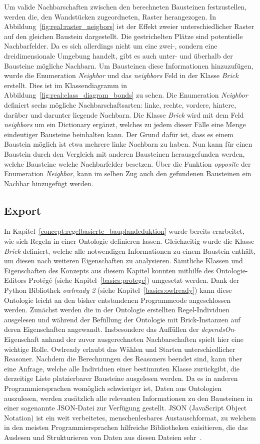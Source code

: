 Um valide Nachbarschaften zwischen den berechneten Bausteinen festzustellen, werden die, den Wandstücken zugeordneten, Raster herangezogen.
In Abbildung~\ref{fig:real:raster_neigbors} ist der Effekt zweier unterschiedlicher Raster auf den gleichen Baustein dargestellt.
Die gestrichelten Plätze sind potentielle Nachbarfelder.
Da es sich allerdings nicht um eine zwei-, sondern eine dreidimensionale Umgebung handelt, gibt es auch unter- und überhalb der Bausteine mögliche Nachbarn.
Um Bausteinen diese Informationen hinzuzufügen, wurde die Enumeration \textit{Neighbor} und das \textit{neighbors} Feld in der Klasse \textit{Brick} erstellt.
Dies ist im Klassendiagramm in Abbildung~\ref{fig:real:class_diagram_bonds} zu sehen.
Die Enumeration \textit{Neighbor} definiert sechs mögliche Nachbarschaftsarten: linke, rechte, vordere, hintere, darüber und darunter liegende Nachbarn.
Die Klasse \textit{Brick} wird mit dem Feld \textit{neighbors} um ein Dictionary ergänzt, welches zu jedem dieser Fälle eine Menge eindeutiger Bausteine beinhalten kann.
Der Grund dafür ist, dass es einem Baustein möglich ist etwa mehrere linke Nachbarn zu haben.
Nun kann für einen Baustein durch den Vergleich mit anderen Bausteinen herausgefunden werden, welche Bausteine welche Nachbarfelder besetzen.
Über die Funktion \textit{opposite} der Enumeration \textit{Neighbor}, kann im selben Zug auch den gefundenen Bausteinen ein Nachbar hinzugefügt werden.


\subsection{Export}\label{real:export}
In Kapitel~\ref{concept:regelbasierte_bauplandeduktion} wurde bereits erarbeitet, wie sich Regeln in einer Ontologie definieren lassen.
Gleichzeitig wurde die Klasse \textit{Brick} definiert, welche alle notwendigen Informationen zu einem Baustein enthält, um diesen nach weiteren Eigenschaften zu analysieren.
Sämtliche Klassen und Eigenschaften des Konzepts aus diesem Kapitel konnten mithilfe des Ontologie-Editors Protégé (siehe Kapitel~\ref{basics:protege}) umgesetzt werden.
Dank der Python Bibliothek \textit{owlready 2} (siehe Kapitel~\ref{basics:owlready}) kann diese Ontologie leicht an den bisher entstandenen Programmcode angeschlossen werden.
Zunächst werden die in der Ontologie erstellten Regel-Individuen ausgelesen und während der Befüllung der Ontologie mit Brick-Instanzen auf deren Eigenschaften angewandt.
Insbesondere das Auffüllen der \textit{dependsOn}-Eigenschaft anhand der zuvor ausgerechneten Nachbarschaften spielt hier eine wichtige Rolle.
Owlready erlaubt das Wählen und Starten unterschiedlicher Reasoner.
Nachdem die Berechnungen des Reasoners beendet sind, kann über eine Anfrage, welche alle Individuen einer bestimmten Klasse zurückgibt, die derzeitige Liste platzierbarer Bausteine ausgelesen werden.
Da es in anderen Programmiersprachen womöglich schwieriger ist, Daten aus Ontologien auszulesen, werden zusätzlich alle relevanten Informationen zu den Bausteinen in einer sogenannte JSON-Datei zur Verfügung gestellt.
JSON (JavaScript Object Notation) ist ein weit verbeitetes, menschenlesbares Austauschformat, zu welchem in den meisten Programmiersprachen hilfreiche Bibliotheken exisitieren, die das Auslesen und Strukturieren von Daten aus diesen Dateien sehr~\cite{json}.
